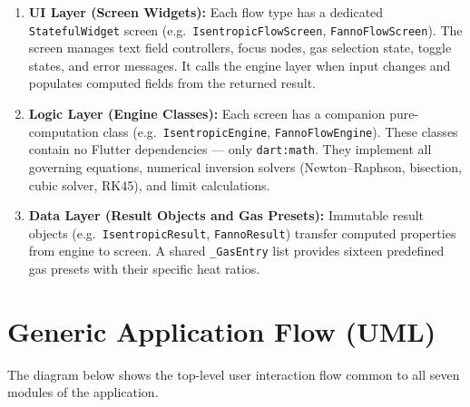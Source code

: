 \begin{enumerate}
    \item \textbf{UI Layer (Screen Widgets):} Each flow type has a dedicated \texttt{StatefulWidget} screen (e.g.\ \texttt{IsentropicFlowScreen}, \texttt{FannoFlowScreen}). The screen manages text field controllers, focus nodes, gas selection state, toggle states, and error messages. It calls the engine layer when input changes and populates computed fields from the returned result.
    \item \textbf{Logic Layer (Engine Classes):} Each screen has a companion pure-computation class (e.g.\ \texttt{IsentropicEngine}, \texttt{FannoFlowEngine}). These classes contain no Flutter dependencies — only \texttt{dart:math}. They implement all governing equations, numerical inversion solvers (Newton--Raphson, bisection, cubic solver, RK45), and limit calculations.
    \item \textbf{Data Layer (Result Objects and Gas Presets):} Immutable result objects (e.g.\ \texttt{IsentropicResult}, \texttt{FannoResult}) transfer computed properties from engine to screen. A shared \texttt{\_GasEntry} list provides sixteen predefined gas presets with their specific heat ratios.
\end{enumerate}

\section{Generic Application Flow (UML)}

The diagram below shows the top-level user interaction flow common to all seven modules of the application.

